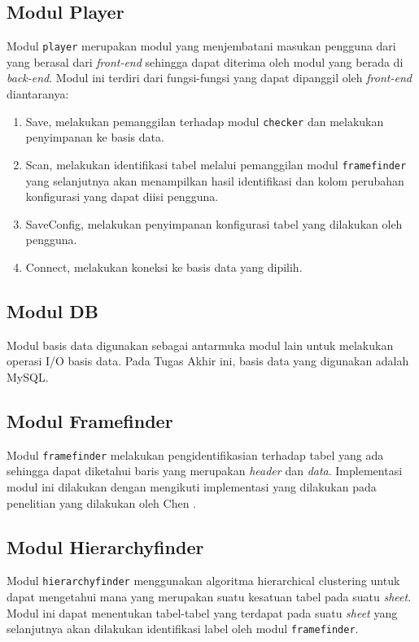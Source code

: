 	\subsection{Modul Player}
	Modul \texttt{player} merupakan modul yang menjembatani masukan pengguna dari yang berasal dari \textit{front-end} sehingga dapat diterima oleh modul yang berada di \textit{back-end}. Modul ini terdiri dari fungsi-fungsi yang dapat dipanggil oleh \textit{front-end} diantaranya:
	\begin{enumerate}
		\item Save, melakukan pemanggilan terhadap modul \texttt{checker} dan melakukan penyimpanan ke basis data.
		\item Scan, melakukan identifikasi tabel melalui pemanggilan modul \texttt{framefinder} yang selanjutnya akan menampilkan hasil identifikasi dan kolom perubahan konfigurasi yang dapat diisi pengguna.
		\item SaveConfig, melakukan penyimpanan konfigurasi tabel yang dilakukan oleh pengguna.
		\item Connect, melakukan koneksi ke basis data yang dipilih.
	\end{enumerate}

	\subsection{Modul DB}
	Modul basis data digunakan sebagai antarmuka modul lain untuk melakukan operasi I/O basis data. Pada Tugas Akhir ini, basis data yang digunakan adalah MySQL.

	\subsection{Modul Framefinder}
	Modul \texttt{framefinder} melakukan pengidentifikasian terhadap tabel yang ada sehingga dapat diketahui baris yang merupakan \textit{header} dan \textit{data}. Implementasi modul ini dilakukan dengan mengikuti implementasi yang dilakukan pada penelitian yang dilakukan oleh Chen \citep{Chen2013}.
	
	\subsection{Modul Hierarchyfinder}
	Modul \texttt{hierarchyfinder} menggunakan algoritma hierarchical clustering untuk dapat mengetahui mana yang merupakan suatu kesatuan tabel pada suatu \textit{sheet}. Modul ini dapat menentukan tabel-tabel yang terdapat pada suatu \textit{sheet} yang selanjutnya akan dilakukan identifikasi label oleh modul \texttt{framefinder}.

